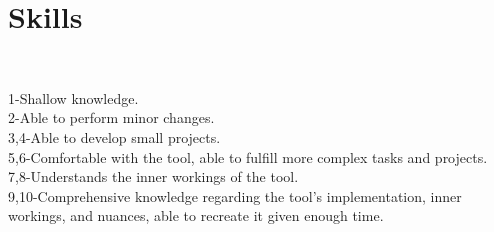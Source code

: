 \documentclass[A4]{deedy-resume} %
\newcommand\resume[2]{%
  \ifnum#1>#2
    $#1 > #2$
  \else
    \ifnum#1<0
      $#1 < 0$
    \else
      \ifnum#2<0
        $#2 < 0$
      \else
        \tikz{%
        \ifx#20
        \else
          \foreach \i in {1,...,#2} {
            \filldraw[black!20] (\i ex,0) circle (0.4ex);
          };
        \fi
        \ifx#10
        \else
          \foreach \i in {1,...,#1} {
            \filldraw[black] (\i ex,0) circle (0.4ex);
          };
        \fi
        }
      \fi
    \fi
  \fi
}
\begin{document}
\begin{minipage}[t]{0.33\textwidth}

\section{Skills}


\\

\vspace*{0.2cm}

\vspace*{0.2cm}


\vspace*{0.3cm}

\scriptsize 1-Shallow knowledge.\\
2-Able to perform minor changes.\\
3,4-Able to develop small projects.\\
5,6-Comfortable with the tool, able to fulfill more complex tasks and projects.\\
7,8-Understands the inner workings of the tool. \\
9,10-Comprehensive knowledge regarding the tool's implementation, inner workings, and nuances, able to recreate it given enough time.


\end{minipage}
\end{document}
